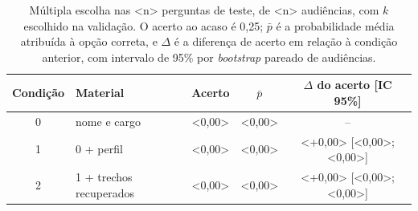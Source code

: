 \begin{table}[!htb]
  \centering
  \caption{Múltipla escolha nas <n> perguntas de teste, de <n> audiências, com $k$ escolhido na
  validação. O acerto ao acaso é 0,25; $\bar{p}$ é a probabilidade média atribuída à opção correta, e
  $\Delta$ é a diferença de acerto em relação à condição anterior, com intervalo de 95\% por
  \textit{bootstrap} pareado de audiências.}
  \label{tab:resultados}
  \small
  \begin{tabular*}{\textwidth}{@{\extracolsep{\fill}}clccc@{}}
    \toprule
    \textbf{Condição} & \textbf{Material} & \textbf{Acerto} & $\bar{p}$ & $\Delta$ \textbf{do acerto [IC 95\%]} \\
    \midrule
    0 & nome e cargo                   & <0,00> & <0,00> & -- \\
    1 & 0 + perfil                     & <0,00> & <0,00> & <+0,00> [<0,00>; <0,00>] \\
    2 & 1 + trechos recuperados        & <0,00> & <0,00> & <+0,00> [<0,00>; <0,00>] \\
    \bottomrule
  \end{tabular*}
\end{table}
